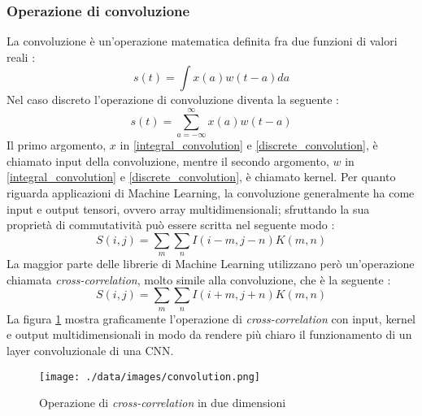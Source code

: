 \subsubsection{Operazione di convoluzione}
La convoluzione è un'operazione matematica definita fra due funzioni di valori reali \cite{goodfellow2016deep}:
\begin{equation}
	s(t)=\int{x(a)w(t-a)da}
	\label{integral_convolution}
\end{equation}
Nel caso discreto l'operazione di convoluzione diventa la seguente \cite{goodfellow2016deep}:
\begin{equation}
	s(t)=\sum_{a=-\infty}^{\infty}{x(a)w(t-a)}
	\label{discrete_convolution}
\end{equation}
Il primo argomento, $x$ in \ref{integral_convolution} e \ref{discrete_convolution}, è chiamato input della convoluzione, mentre il secondo argomento, $w$ in \ref{integral_convolution} e \ref{discrete_convolution}, è chiamato kernel.
Per quanto riguarda applicazioni di Machine Learning, la convoluzione generalmente ha come input e output tensori, ovvero array multidimensionali; sfruttando la sua proprietà di commutatività può essere scritta nel seguente modo \cite{goodfellow2016deep}:
\begin{equation}
	S(i,j)=\sum_{m}{\sum_{n}{I(i-m,j-n)K(m,n)}}
	\label{multidimensional_convolution}
\end{equation}
La maggior parte delle librerie di Machine Learning utilizzano però un'operazione chiamata \textit{cross-correlation}, molto simile alla convoluzione, che è la seguente \cite{goodfellow2016deep}:
\begin{equation}
S(i,j)=\sum_{m}{\sum_{n}{I(i+m,j+n)K(m,n)}}
\label{cross-correlation}
\end{equation}
La figura \ref{convolution} mostra graficamente l'operazione di \textit{cross-correlation} con input, kernel e output multidimensionali in modo da rendere più chiaro il funzionamento di un layer convoluzionale di una CNN.
\begin{figure}
	\centering
	\texttt{[image: ./data/images/convolution.png]}
	\caption{Operazione di \textit{cross-correlation} in due dimensioni \cite{goodfellow2016deep} }
	\label{convolution}
\end{figure}


\iffalse
\subsubsection{Layer convoluzionale}
Un layer convoluzionale è un array di \textit{feature-maps}; una \textit{feature-map} è una matrice di neuroni; neuroni appartenenti alla stessa \textit{feature-map} sono caratterizzati dagli stessi pesi; questa è una caratteristica molto importante di un layer convoluzionale, perché, oltre a diminuire il numero di parametri rispetto ai classici layer \textit{fully-connected}, rende la rete invariante rispetto alle traslazioni dell'input: essendo i pesi di ogni neurone identici in una stessa \textit{feature-map}, ogni neurone reagirà allo stesso modo a stessi valori di input in qualsiasi zona dell'immagine essi si trovino.
\fi

